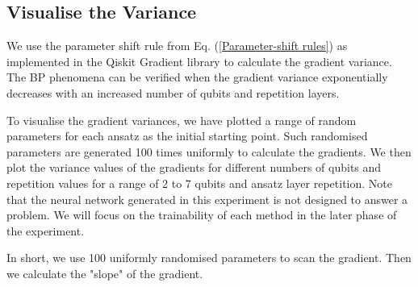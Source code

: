 \subsection{Visualise the Variance} \label{Sec: Visualise the Variance}
We use the parameter shift rule from Eq. (\ref{Parameter-shift rules}) as implemented in the Qiskit Gradient library to calculate the gradient variance.
The BP phenomena can be verified when the gradient variance exponentially decreases with an increased number of qubits and repetition layers.

To visualise the gradient variances, we have plotted a range of random parameters for each ansatz as the initial starting point.
Such randomised parameters are generated 100 times uniformly to calculate the gradients.
We then plot the variance values of the gradients for different numbers of qubits and repetition values for a range of 2 to 7 qubits and ansatz layer repetition.
Note that the neural network generated in this experiment is not designed to answer a problem.
We will focus on the trainability of each method in the later phase of the experiment.

In short, we use 100 uniformly randomised parameters to scan the gradient.
Then we calculate the "slope" of the gradient.